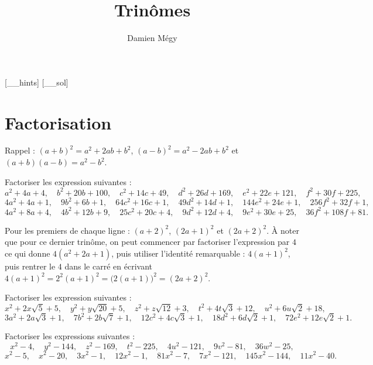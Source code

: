




[_\jobname_hints]
[_\jobname_sol]


\title{Trinômes}
\author{Damien Mégy}
\maketitle

\section{Factorisation}


Rappel :  $(a+b)^2=a^2+2ab+b^2$, $(a-b)^2=a^2-2ab+b^2$ et $(a+b)(a-b)=a^2-b^2$.

\begin{exo}
Factoriser les expression suivantes : 
\[ a^2+4a+4, \quad
b^2+20b+100,\quad
c^2+14c+49,\quad
d^2+26d+169,\quad
e^2+22e+121,\quad
f^2+30f+225,
\]
\[ 
4a^2+4a+1,\quad
9b^2+6b+1,\quad
64c^2+16c+1,\quad
49d^2+14d+1,\quad
144e^2+24e+1,\quad
256f^2+32f+1,
\]
\[
4a^2+8a+4,\quad
4b^2+12b+9,\quad
25c^2+20c+4,\quad
9d^2+12d+4,\quad
9e^2+30e+25,\quad
36f^2+108f+81.
\]
\begin{hint}
Pour les premiers de chaque ligne : $(a+2)^2$, $(2a+1)^2$ et $(2a+2)^2$. À noter que pour ce dernier trinôme, on peut commencer par factoriser l'expression par $4$ ce qui donne $4(a^2+2a+1)$, puis utiliser l'identité remarquable : $4(a+1)^2$, puis \og rentrer\fg{} le $4$ dans le carré en écrivant $4(a+1)^2 = 2^2(a+1)^2 = \big(2(a+1)\big)^2 = (2a+2)^2$.
\end{hint}
\end{exo}

\begin{exo}
Factoriser les expression suivantes : 
\[ 
x^2+2x\sqrt{5}+5,\quad
y^2+y\sqrt{20}+5,\quad
z^2+z\sqrt{12}+3,\quad
t^2+4t\sqrt{3}+12,\quad
u^2+6u\sqrt{2}+18,
\]
\[
3a^2+2a\sqrt{3}+1,\quad
7b^2+2b\sqrt{7}+1,\quad
12c^2+4c\sqrt{3}+1,\quad
18d^2+6d\sqrt{2}+1,\quad
72e^2+12e\sqrt{2}+1.
\]
\end{exo}


\begin{exo}
Factoriser les expressions suivantes :
\[
x^2-4,\quad 
y^2-144,\quad 
z^2-169,\quad 
t^2-225,\quad 
4u^2-121,\quad
9v^2-81,\quad
36w^2-25,
\]
\[
x^2-5,\quad
x^2-20,\quad
3x^2-1,\quad
12x^2-1,\quad
81x^2-7,\quad
7x^2-121,\quad
145x^2-144,\quad
11x^2-40.
\]
\end{exo}



